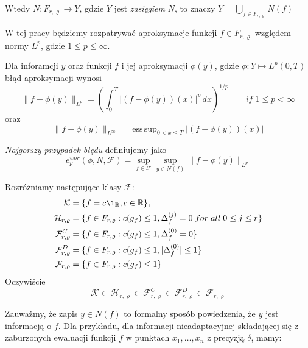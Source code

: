 \documentclass[oik, pdftex, robocza, man]{mgrwms}
\DeclareMathOperator*{\esssup}{ess\,sup}
\begin{document}
\noindent
Wtedy $N\!: F_{r, \varrho} \longrightarrow Y$, gdzie $Y$ jest \textit{zasięgiem} $N$, to znaczy $\displaystyle Y = \bigcup_{f \in F_{r, \varrho}} N(f)$

W tej pracy będziemy rozpatrywać aproksymacje funkcji $f \in F_{r, \varrho}$ względem normy $L^p$, gdzie $1 \leq p \leq \infty$.

Dla inforamcji $y$ oraz funkcji $f$ i jej aproksymacji $\phi(y)$, gdzie $\phi : Y \longmapsto L^p(0, T)$ błąd aproksymacji wynosi
\begin{equation*}
    \|f-\phi(y)\|_{L^p} = \left( \int_{0}^{T} |(f-\phi(y))(x)|^p \,dx  \right)^{1/p} \qquad if \; 1 \leq p < \infty
\end{equation*}
oraz
\begin{equation*}
    \|f-\phi(y)\|_{L^\infty} = \esssup_{0 < x \leq T} | (f - \phi(y))(x) |
\end{equation*}

\textit{Najgorszy przypadek błędu} definiujemy jako
\begin{equation*}
    e^{wor}_{p}(\phi, N, \mathcal{F}) = \sup_{f \in \mathcal{F}} \sup_{y \in N(f)} \|f - \phi(y) \|_{L^p}
\end{equation*}

Rozróżniamy następujące klasy $\mathcal{F}$:
\begin{equation*}
    \begin{split}
        \mathcal{K} & = \{f = c \1_{\R}, c \in \R \}, \\
        \mathcal{H}_{r, \varrho} & = \{ f \in F_{r, \varrho}: c(g_{f}) \leq 1, \Delta_{f}^{(j)} = 0 \; for\; all\; 0 \leq j \leq r\} \\
        \mathcal{F}_{r, \varrho}^{C} & = \{ f \in F_{r, \varrho}: c(g_{f}) \leq 1, \Delta_{f}^{(0)} = 0 \} \\
        \mathcal{F}_{r, \varrho}^{D} & = \{ f \in F_{r, \varrho}: c(g_{f}) \leq 1, | \Delta_{f}^{(0)} | \leq 1 \} \\
        \mathcal{F}_{r, \varrho} & = \{ f \in F_{r, \varrho}: c(g_{f}) \leq 1 \} \\
    \end{split}
\end{equation*}
Oczywiście
\begin{equation*}
    \mathcal{K} \subset \mathcal{H}_{r, \varrho} \subset \mathcal{F}_{r, \varrho}^{C} \subset \mathcal{F}_{r, \varrho}^{D} \subset \mathcal{F}_{r, \varrho}
\end{equation*}

Zauważmy, że zapis $y \in N(f)$ to formalny sposób powiedzenia, że $y$ jest informacją o $f$. Dla przykładu, dla informacji nieadaptacyjnej składającej się z zaburzonych ewaluacji funkcji $f$ w punktach $x_{1}, \dots, x_{n}$ z precyzją $\delta$, mamy:
\end{document}
